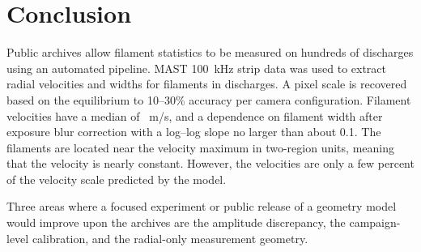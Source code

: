 \section{Conclusion}
\label{sec:conclusion}
Public archives allow filament statistics to be measured on hundreds of discharges using an automated pipeline. MAST 100~kHz strip data was used to extract radial velocities and widths for \nTracksSel{} filaments in \nShotsStats{} discharges. A pixel scale is recovered based on the equilibrium to 10--30\% accuracy per camera configuration. Filament velocities have a median of \vMedAll~m/s, and a dependence on filament width after exposure blur correction with a log--log slope no larger than about 0.1. The filaments are located near the velocity maximum in two-region units, meaning that the velocity is nearly constant. However, the velocities are only a few percent of the velocity scale predicted by the model.

Three areas where a focused experiment or public release of a geometry model would improve upon the archives are the amplitude discrepancy, the campaign-level calibration, and the radial-only measurement geometry.
